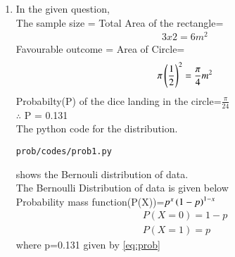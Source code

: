 \renewcommand{\theequation}{\theenumi}
\begin{enumerate}[label=\arabic*.,ref=\thesubsubsection.\theenumi]

\item In the given question,
\\
The sample size = Total Area of the rectangle=
\begin{align}
3x2=6 m^2
\end{align}
Favourable outcome = Area of Circle=
\begin{align}
\pi\left(\frac{1}{2}\right)^2=\frac{\pi}{4} m^2 
\end{align}
Probabilty(P) of the dice landing in the circle=$\frac{\pi}{24}$
\\
$\therefore$ P = 0.131
\label{eq:prob}
\\
The python code for the distribution.
\begin{lstlisting}
prob/codes/prob1.py
\end{lstlisting}
shows the Bernouli distribution of data.
\\
The Bernoulli Distribution of data is given below
\\
Probability mass function(P(X))=$p^x\left(1-p\right)^{1-x}$
\begin{align}
P(X=0)=1-p
\\
P(X=1)=p
\end{align}
where p=0.131 given by \ref{eq:prob}
\end{enumerate}